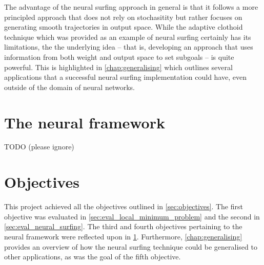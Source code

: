 The advantage of the neural surfing approach in general is that it follows a more principled approach that does not rely on stochasitity but rather focuses on generating smooth trajectories in output space.
While the adaptive clothoid technique which was provided as an example of neural surfing certainly has its limitations, the the underlying idea -- that is, developing an approach that uses information from both weight and output space to set subgoals -- is quite powerful.
This is highlighted in \ref{chap:generalising} which outlines several applications that a successful neural surfing implementation could have, even outside of the domain of neural networks.

\section{The neural framework}
\label{sec:eval_neural_framework}
TODO (please ignore)





\section{Objectives}
This project achieved all the objectives outlined in \ref{sec:objectives}. 
The first objective was evaluated in \ref{sec:eval_local_minimum_problem} and the second in \ref{sec:eval_neural_surfing}.
The third and fourth objectives pertaining to the neural framework were reflected upon in \ref{sec:eval_neural_framework}.
Furthermore, \ref{chap:generalising} provides an overview of how the neural surfing technique could be generalised to other applications, as was the goal of the fifth objective.

